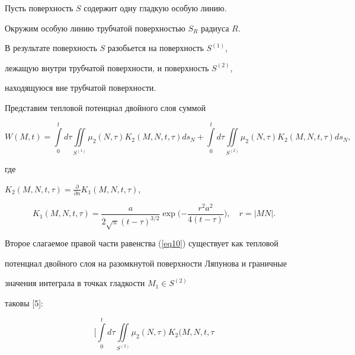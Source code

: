 \begin{pf}


Пусть поверхность $S$ содержит одну гладкую особую линию. 


Окружим особую линию трубчатой поверхностью $S_{R} $ радиуса $R$.


В результате поверхность $S$ разобьется на поверхность $S^{({1})}$,


лежащую внутри трубчатой поверхности, и поверхность $S^{({2})}$,


находящуюся вне трубчатой поверхности.





Представим тепловой потенциал двойного слоя суммой


\begin{equation}


\label{eq10}


W ({M,t})=\int\limits_{0}^{t} {} d\tau 


\iint\limits_{S^{({1})}} {} \mu_{2} ({N,\tau})K_{2}({M,N,t,\tau})ds_{N}+


\int\limits_{0}^{t} {} d\tau 


\iint\limits_{S^{({2})}} {} \mu_{2} ({N,\tau})K_{2}({M,N,t,\tau})ds_{N},


\end{equation}


где


$K_2({M,N,t,\tau})=\frac{{\partial}}{{\partial n}}K_1({M,N,t,\tau})$, 


$$


K_{1} ({M,N,t,\tau})=\frac{{a}}{{2\sqrt {\pi} ({t-\tau})^{3/2}}}


\exp\bigg({- \frac{{r^{2}a^{2}}}{{4 ({t-\tau})}}}\bigg),\quad r=| {MN} |.


$$


Второе слагаемое правой части равенства (\ref{eq10}) существует как тепловой 


потенциал двойного слоя на разомкнутой поверхности Ляпунова и граничные 


значения интеграла в точках гладкости $M_{1} \in S^{({2})}$ 


таковы [5]:


\begin{equation}


\label{eq11}


\bigg[{\int\limits_{0}^{t} {} d\tau \iint\limits_{S^{({2} 


)}} {} \mu_{2} ({N,\tau})K_{2} ({M,N,t,\tau} 


}
\end{equation}
\end{pf}
